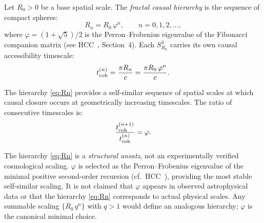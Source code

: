 \documentclass[12pt,a4paper]{article}
\theoremstyle{plain}
\theoremstyle{definition}
\theoremstyle{remark}
\newcommand{\vph}{\varphi}
\begin{document}
\begin{tcolorbox}[defbox={Definition 6.1 — Fractal Causal Hierarchy}]
Let $R_0 > 0$ be a base spatial scale.
The \emph{fractal causal hierarchy} is the sequence of compact spheres:
\begin{equation}
  R_n = R_0\,\vph^n, \qquad n = 0, 1, 2, \ldots,
  \label{eq:Rn}
\end{equation}
where $\vph = (1+\sqrt{5})/2$ is the Perron--Frobenius eigenvalue of the
Fibonacci companion matrix (see HCC~\cite{HCC25}, Section~4).
Each $S^3_{R_n}$ carries its own causal accessibility timescale:
\begin{equation}
  t_{\rm coh}^{(n)} = \frac{\pi R_n}{c} = \frac{\pi R_0\,\vph^n}{c}.
  \label{eq:tcoh_n}
\end{equation}
\end{tcolorbox}

The hierarchy \eqref{eq:Rn} provides a self-similar sequence of spatial scales
at which causal closure occurs at geometrically increasing timescales.
The ratio of consecutive timescales is:
\begin{equation}
  \frac{t_{\rm coh}^{(n+1)}}{t_{\rm coh}^{(n)}} = \vph.
  \label{eq:tcoh_ratio}
\end{equation}

\begin{tcolorbox}[remarkbox={Remark 6.1 — $\varphi$ is a Structural Ansatz}]
The hierarchy \eqref{eq:Rn} is a \emph{structural ansatz}, not an experimentally
verified cosmological scaling.
$\vph$ is selected as the Perron--Frobenius eigenvalue of the minimal positive
second-order recursion (cf.\ HCC~\cite{HCC25}), providing the most stable
self-similar scaling.
It is not claimed that $\vph$ appears in observed astrophysical data or that
the hierarchy \eqref{eq:Rn} corresponds to actual physical scales.
Any summable scaling $\{R_0\,q^n\}$ with $q > 1$ would define an analogous hierarchy;
$\vph$ is the canonical minimal choice.
\end{tcolorbox}
\end{document}
